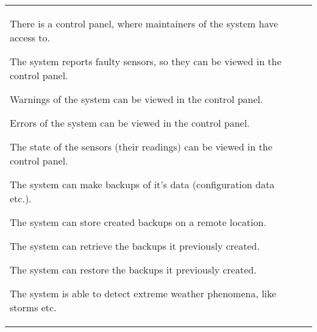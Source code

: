 \begin{longtable}{L{0.1\textwidth} L{0.12\textwidth} L{0.78\textwidth}}
    { There is a control panel, where maintainers of the system have access to. }  %
    
    { The system reports faulty sensors, so they can be viewed in the control panel. }
    
    { Warnings of the system can be viewed in the control panel. }

	{ Errors of the system can be viewed in the control panel. }
	
	{ The state of the sensors (their readings) can be viewed in the control panel. }
    
    
    { The system can make backups of it's data (configuration data etc.). }
    
    { The system can store created backups on a remote location. }
      
    { The system can retrieve the backups it previously created. }
    
    { The system can restore the backups it previously created. }

    { The system is able to detect extreme weather phenomena, like storms etc. }
    
    \bottomrule
\end{longtable}